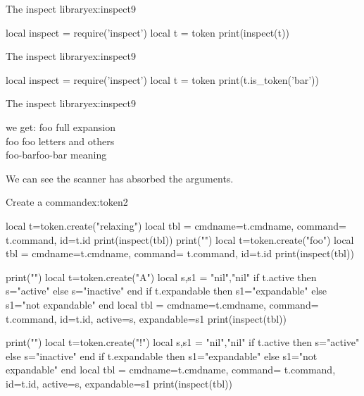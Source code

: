 \begin{texexample}{The inspect library}{ex:inspect9}
\begin{luacode}
local inspect = require('inspect')
local t = token
print(inspect(t))
\end{luacode}
\end{texexample}



\begin{texexample}{The inspect library}{ex:inspect9}
\gdef\bar{bar}
\gdef\foo{foo-\bar}
\begin{luacode}
local inspect = require('inspect')
local t = token
print(t.is_token('bar'))
\end{luacode}
\end{texexample}


\begin{texexample}{The inspect library}{ex:inspect9}
\def\bar{bar}
\def\foo{foo-\bar}

we get:
 foo full expansion\\
foo foo letters and others\\
\foo foo-bar meaning\\
\end{texexample}

We can see the scanner has absorbed the arguments.


\begin{texexample}{Create a command}{ex:token2}
\edef\relaxing{relaxing}
\def\foo#1{#1}
\begin{luacode}
local t=token.create("relaxing")
local tbl = {cmdname=t.cmdname, command= t.command, id=t.id}
print(inspect(tbl))
print("")
local t=token.create("foo")
local tbl = {cmdname=t.cmdname, command= t.command, id=t.id}
print(inspect(tbl))

print("")
local t=token.create("A")
local s,s1 = "nil","nil"
if t.active then s="active" else s="inactive" end
if t.expandable then s1="expandable" else s1="not expandable" end
local tbl = {cmdname=t.cmdname, command= t.command, id=t.id, active=s, expandable=s1}
print(inspect(tbl))

print("")
local t=token.create("!")
local s,s1 = "nil","nil"
if t.active then s="active" else s="inactive" end
if t.expandable then s1="expandable" else s1="not expandable" end
local tbl = {cmdname=t.cmdname, command= t.command, id=t.id, active=s, expandable=s1}
print(inspect(tbl))
\end{luacode}
\end{texexample}

